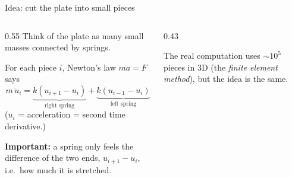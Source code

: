 \documentclass[aspectratio=169,11pt]{beamer}
\begin{document}
\begin{frame}{Idea: cut the plate into small pieces}
  \begin{columns}[c]
    \begin{column}{0.55\textwidth}
      Think of the plate as many small \alert{masses} connected by \alert{springs}.
      \medskip

      For each piece $i$, Newton's law $m a = F$ says
      \[
        m\,\ddot u_i = \underbrace{k(u_{i+1}-u_i)}_{\text{right spring}}
                     + \underbrace{k(u_{i-1}-u_i)}_{\text{left spring}}
      \]
      ($\ddot u_i$ = acceleration = second time derivative.)
      \medskip

      \textbf{Important:} a spring only feels the \alert{difference} of the two ends,
      $u_{i+1}-u_i$, i.e.\ how much it is stretched.
    \end{column}
    \begin{column}{0.43\textwidth}
      \centering
      \medskip

      {\small The real computation uses $\sim 10^5$ pieces in 3D
      (the \emph{finite element method}), but the idea is the same.}
    \end{column}
  \end{columns}
\end{frame}
\end{document}

